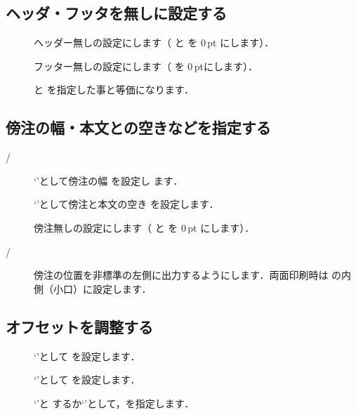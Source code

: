 \subsection{ヘッダ・フッタを無しに設定する}
\begin{description}
 \item[] 
  ヘッダー無しの設定にします（ と  を 0\,pt
  にします）．
 \item[] 
  フッター無しの設定にします（ を 0\,ptにします）．
 \item[] 
   と  を指定した事と等価になります．
\end{description}

\subsection{傍注の幅・本文との空きなどを指定する}
\begin{description}
 \item[/] 
  `'として傍注の幅  を設定し
  ます．
 \item[]
  `'として傍注と本文の空き 
  を設定します． 
 \item[]
  傍注無しの設定にします（ と  を
  0\,pt にします）．
 \item[/]
 傍注の位置を非標準の左側に出力するようにします．両面印刷時は
 の内側（小口）に設定します．
\end{description}

\subsection{オフセットを調整する}
\begin{description}
 \item[]
  `'として  を設定します．
 \item[]
  `'として  を設定します．
 \item[]
  `'と
  するか`'として，を指定します．
\end{description}

